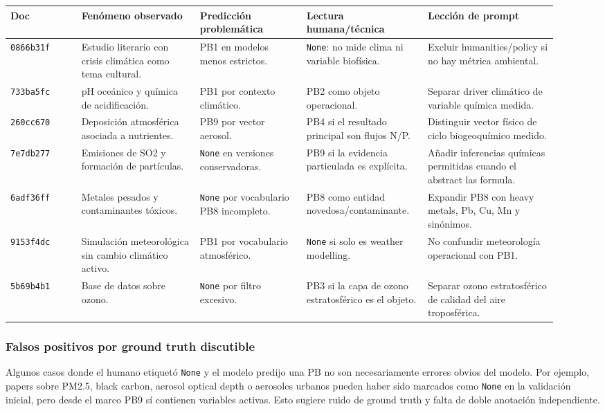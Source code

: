 \begin{center}
\scriptsize
\setlength{\tabcolsep}{3pt}
\renewcommand{\arraystretch}{1.15}
\begin{tabular}{p{0.12\linewidth}p{0.20\linewidth}p{0.18\linewidth}p{0.20\linewidth}p{0.22\linewidth}}
\toprule
Doc & Fenómeno observado & Predicción problemática & Lectura humana/técnica & Lección de prompt \\
\midrule
\texttt{0866b31f} & Estudio literario con crisis climática como tema cultural. & PB1 en modelos menos estrictos. & \texttt{None}: no mide clima ni variable biofísica. & Excluir humanities/policy si no hay métrica ambiental. \\
\texttt{733ba5fc} & pH oceánico y química de acidificación. & PB1 por contexto climático. & PB2 como objeto operacional. & Separar driver climático de variable química medida. \\
\texttt{260cc670} & Deposición atmosférica asociada a nutrientes. & PB9 por vector aerosol. & PB4 si el resultado principal son flujos N/P. & Distinguir vector físico de ciclo biogeoquímico medido. \\
\texttt{7e7db277} & Emisiones de SO2 y formación de partículas. & \texttt{None} en versiones conservadoras. & PB9 si la evidencia particulada es explícita. & Añadir inferencias químicas permitidas cuando el abstract las formula. \\
\texttt{6adf36ff} & Metales pesados y contaminantes tóxicos. & \texttt{None} por vocabulario PB8 incompleto. & PB8 como entidad novedosa/contaminante. & Expandir PB8 con heavy metals, Pb, Cu, Mn y sinónimos. \\
\texttt{9153f4dc} & Simulación meteorológica sin cambio climático activo. & PB1 por vocabulario atmosférico. & \texttt{None} si solo es weather modelling. & No confundir meteorología operacional con PB1. \\
\texttt{5b69b4b1} & Base de datos sobre ozono. & \texttt{None} por filtro excesivo. & PB3 si la capa de ozono estratosférico es el objeto. & Separar ozono estratosférico de calidad del aire troposférica. \\
\bottomrule
\end{tabular}
\end{center}

\subsubsection{Falsos positivos por ground truth discutible}

Algunos casos donde el humano etiquetó \texttt{None} y el modelo predijo una PB no son necesariamente errores obvios del modelo. Por ejemplo, papers sobre PM2.5, black carbon, aerosol optical depth o aerosoles urbanos pueden haber sido marcados como \texttt{None} en la validación inicial, pero desde el marco PB9 sí contienen variables activas. Esto sugiere ruido de ground truth y falta de doble anotación independiente.

